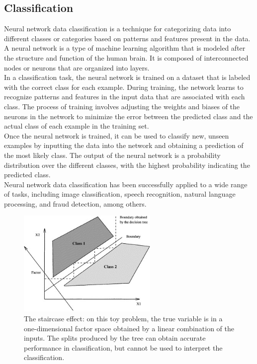     \subsection{Classification} \label{subsec:clasification}
    Neural network data classification is a technique for categorizing data into different classes or categories based on patterns and features
    present in the data. A neural network is a type of machine learning algorithm that is modeled after the structure and function of the human brain.
    It is composed of interconnected nodes or neurons that are organized into layers.\\
    In a classification task, the neural network is trained on a dataset that is labeled with the correct class for each example.
    During training, the network learns to recognize patterns and features in the input data that are associated with each class.
    The process of training involves adjusting the weights and biases of the neurons in the network to minimize the error between the predicted
    class and the actual class of each example in the training set.\\
    Once the neural network is trained, it can be used to classify new, unseen examples by inputting the data into the network and
    obtaining a prediction of the most likely class. The output of the neural network is a probability distribution over the different classes,
    with the highest probability indicating the predicted class.\\
    Neural network data classification has been successfully applied to a wide range of tasks, including image classification, speech recognition,
    natural language processing, and fraud detection, among others.
    \begin{center}
        \begin{figure}[!ht]
            \centering
            \includegraphics[width=0.6\textwidth]{figures/classification}
            \caption{The staircase effect: on this toy problem, the true variable is in a one-dimensional factor space
            obtained by a linear combination of the inputs. The splits produced by the tree can obtain accurate
            performance in classification, but cannot be used to interpret the classification.\cite{feraud2002methodology} }
            \label{fig:tahn}
        \end{figure}
    \end{center}
